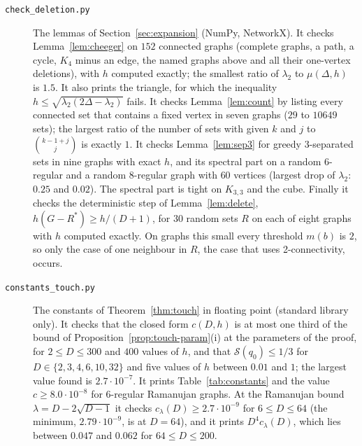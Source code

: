 \begin{description}
\item[\texttt{check\_deletion.py}] The lemmas of Section~\ref{sec:expansion} (NumPy, NetworkX). It checks Lemma~\ref{lem:cheeger} on $152$ connected graphs (complete graphs, a path, a cycle, $K_4$ minus an edge, the named graphs above and all their one-vertex deletions), with $h$ computed exactly; the smallest ratio of $\lambda_2$ to $\mu(\Delta,h)$ is $1.5$. It also prints the triangle, for which the inequality $h\le\sqrt{\lambda_2(2\Delta-\lambda_2)}$ fails. It checks Lemma~\ref{lem:count} by listing every connected set that contains a fixed vertex in seven graphs ($29$ to $10649$ sets); the largest ratio of the number of sets with given $k$ and $j$ to $\binom{k-1+j}j$ is exactly $1$. It checks Lemma~\ref{lem:sep3} for greedy 3-separated sets in nine graphs with exact $h$, and its spectral part on a random $6$-regular and a random $8$-regular graph with $60$ vertices (largest drop of $\lambda_2$: $0.25$ and $0.02$). The spectral part is tight on $K_{3,3}$ and the cube. Finally it checks the deterministic step of Lemma~\ref{lem:delete}, $h(G-R^*)\ge h/(D+1)$, for $30$ random sets $R$ on each of eight graphs with $h$ computed exactly. On graphs this small every threshold $m(b)$ is $2$, so only the case of one neighbour in $R$, the case that uses 2-connectivity, occurs.

\item[\texttt{constants\_touch.py}] The constants of Theorem~\ref{thm:touch} in floating point (standard library only). It checks that the closed form $c(D,h)$ is at most one third of the bound of Proposition~\ref{prop:touch-param}(i) at the parameters of the proof, for $2\le D\le300$ and $400$ values of $h$, and that $\mathcal S(q_0)\le1/3$ for $D\in\{2,3,4,6,10,32\}$ and five values of $h$ between $0.01$ and $1$; the largest value found is $2.7\cdot10^{-7}$. It prints Table~\ref{tab:constants} and the value $c\ge8.0\cdot10^{-8}$ for 6-regular Ramanujan graphs. At the Ramanujan bound $\lambda=D-2\sqrt{D-1}$ it checks $c_\lambda(D)\ge2.7\cdot10^{-9}$ for $6\le D\le64$ (the minimum, $2.79\cdot10^{-9}$, is at $D=64$), and it prints $D^4c_\lambda(D)$, which lies between $0.047$ and $0.062$ for $64\le D\le200$.


\end{description}
